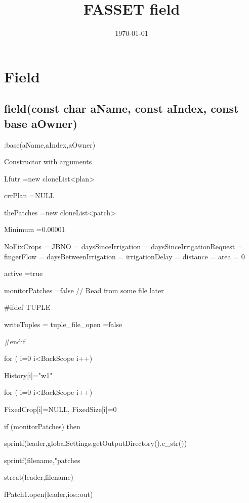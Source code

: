 \documentclass[%
]{scrartcl}
\title{FASSET field}
\author{}
\date{\today}
\begin{document}
\maketitle
 \tableofcontents
\newpage

\section{Field}


\subsection{field(const char aName, const  aIndex, const base aOwner)
}   :base(aName,aIndex,aOwner)

Constructor with arguments

	Lfutr                      =new cloneList<plan>
	
	crrPlan                    =NULL
	
   thePatches                 =new cloneList<patch>
   
   Minimum                    =0.00001

   NoFixCrops =
   JBNO   =
   daysSinceIrrigation        =
	daysSinceIrrigationRequest =
   fingerFlow				      =
   daysBetweenIrrigation      =
   irrigationDelay            =
	distance                   =
   area                       = 0

   active                     =true
   
   monitorPatches             =false     
   // Read from some file later
   
\#ifdef TUPLE

   writeTuples                =
   tuple\_file\_open            =false
   
\#endif


   for ( i=0 i<BackScope i++)  
   
    \quad	 History[i]="w1"


   for ( i=0 i<BackScope i++)

   \quad    FixedCrop[i]=NULL, FixedSize[i]=0


   if (monitorPatches) then
   
       \quad sprintf(leader,globalSettings.getOutputDirectory().c\_str())

       \quad sprintf(filename,"patches%
     
      \quad  strcat(leader,filename)
      
       \quad fPatch1.open(leader,ios::out)
       
\end{document}
